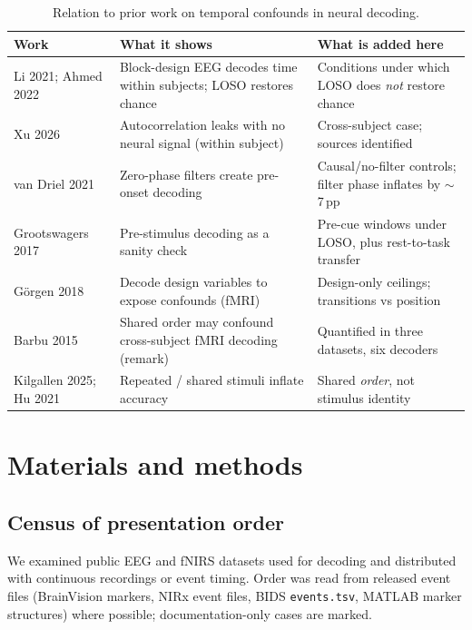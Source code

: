 \documentclass[preprint,11pt]{elsarticle}
\newcommand{\pp}{\,pp}
\begin{document}
\begin{table}[htbp]
\centering
\caption{Relation to prior work on temporal confounds in neural decoding.}
\label{tab:novelty}
\footnotesize
\begin{tabularx}{\textwidth}{@{}>{\raggedright\arraybackslash}p{3.3cm}>{\raggedright\arraybackslash}X>{\raggedright\arraybackslash}p{4.2cm}@{}}
\toprule
Work & What it shows & What is added here \\
\midrule
Li 2021; Ahmed 2022 \citep{li2021,ahmed2022} & Block-design EEG decodes time within subjects; LOSO restores chance & Conditions under which LOSO does \emph{not} restore chance \\
Xu 2026 \citep{xu2026} & Autocorrelation leaks with no neural signal (within subject) & Cross-subject case; sources identified \\
van Driel 2021 \citep{vandriel2021} & Zero-phase filters create pre-onset decoding & Causal/no-filter controls; filter phase inflates by $\sim$7\pp \\
Grootswagers 2017 \citep{grootswagers2017} & Pre-stimulus decoding as a sanity check & Pre-cue windows under LOSO, plus rest-to-task transfer \\
G\"orgen 2018 \citep{gorgen2018} & Decode design variables to expose confounds (fMRI) & Design-only ceilings; transitions vs position \\
Barbu 2015 \citep{barbu2015} & Shared order may confound cross-subject fMRI decoding (remark) & Quantified in three datasets, six decoders \\
Kilgallen 2025; Hu 2021 \citep{kilgallen2025,hu2021} & Repeated / shared stimuli inflate accuracy & Shared \emph{order}, not stimulus identity \\
\bottomrule
\end{tabularx}
\end{table}

\section{Materials and methods}
\label{sec:methods}

\subsection{Census of presentation order}
We examined public EEG and fNIRS datasets used for decoding and distributed with continuous recordings or event timing. Order was read from released event files (BrainVision markers, NIRx event files, BIDS \texttt{events.tsv}, MATLAB marker structures) where possible; documentation-only cases are marked.
\end{document}
